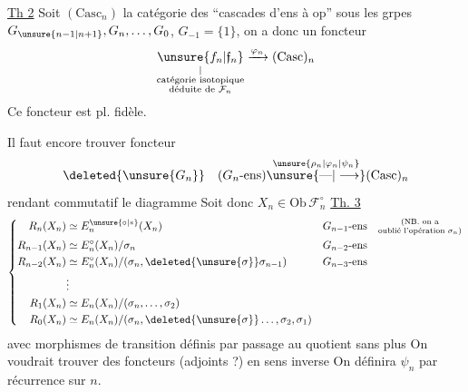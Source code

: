 \uline{Th 2}  Soit $(\mathrm{Casc}_n)$ la catégorie des ``cascades d'ens à op'' sous les grpes $G_{\unsure{n-1|n+1}},G_n,\ldots,G_0$, $G_{-1}=\{1\}$, on a donc un foncteur
\[ \underset{\substack{|\\\text{catégorie isotopique}\\\text{déduite de }\mathcal F_n}}{\unsure{f_n|\mathfrak f_n}}\xrightarrow{\varphi_n}(\mathrm{Casc})_n \]
Ce foncteur est pl. fidèle.

Il faut encore trouver   foncteur 
\[ \deleted{\unsure{G_n}}\quad(G_n\text{-ens})\overset{\unsure{\rho_n|\varphi_n|\psi_n}}{\unsure{\text{---}|\longrightarrow}}(\mathrm{Casc})_n \]
rendant commutatif le diagramme
Soit donc $X_n\in\mathrm{Ob}\,\mathcal F_n^\circ$
\uline{Th. 3}
\[ \left\{\begin{aligned} R_n(X_n)&\simeq E_n^{\unsure{\circ|\ast}}(X_n) && G_{n-1}\text{-ens}\quad\substack{\text{(NB. on a}\\\text{oublié l'opération }\sigma_n)}\\ R_{n-1}(X_n)&\simeq E_n^\circ(X_n)/\sigma_n && G_{n-2}\text{-ens}\\ R_{n-2}(X_n)&\simeq E_n^\circ(X_n)/(\sigma_n,\deleted{\unsure{\sigma}}\sigma_{n-1}) && G_{n-3}\text{-ens}\\ &\vdots\\ R_1(X_n)&\simeq E_n(X_n)/(\sigma_n,\ldots,\sigma_2)\\ R_0(X_n)&\simeq E_n(X_n)/(\sigma_n,\deleted{\unsure{\sigma}}\ldots,\sigma_2,\sigma_1) \end{aligned}\right. \]
\margin{$\checkmark$}
avec morphismes de transition définis par passage au quotient sans plus
On voudrait trouver des foncteurs (adjoints ?) en sens inverse
On définira $\psi_n$ par récurrence sur $n$.

